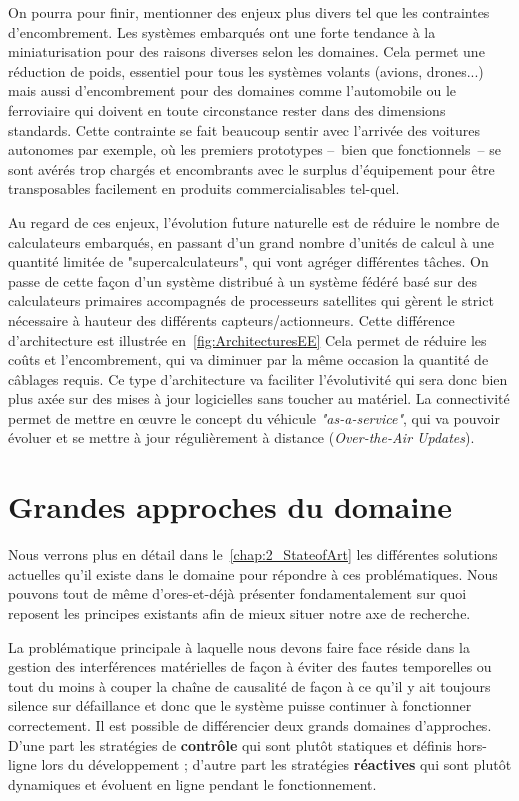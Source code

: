 \documentclass[french, a4paper, 11pt, twoside, pdftex]{StyleThese}
\begin{document}
	On pourra pour finir, mentionner des enjeux plus divers tel que les contraintes d'encombrement. Les systèmes embarqués ont une forte tendance à la miniaturisation pour des raisons diverses selon les domaines. Cela permet une réduction de poids, essentiel pour tous les systèmes volants (avions, drones...) mais aussi d'encombrement pour des domaines comme l'automobile ou le ferroviaire qui doivent en toute circonstance rester dans des dimensions standards. Cette contrainte se fait beaucoup sentir avec l'arrivée des voitures autonomes par exemple, où les premiers prototypes --~bien que fonctionnels~-- se sont avérés trop chargés et encombrants avec le surplus d'équipement pour être transposables facilement en produits commercialisables tel-quel.
	
	Au regard de ces enjeux, l'évolution future naturelle est de réduire le nombre de calculateurs embarqués, en passant d'un grand nombre d'unités de calcul à une quantité limitée de "supercalculateurs", qui vont agréger différentes tâches. On passe de cette façon d'un système distribué à un système fédéré basé sur des calculateurs primaires accompagnés de processeurs satellites qui gèrent le strict nécessaire à hauteur des différents capteurs/actionneurs. Cette différence d'architecture est illustrée en~\autoref{fig:ArchitecturesEE} Cela permet de réduire les coûts et l'encombrement, qui va diminuer par la même occasion la quantité de câblages requis. Ce type d'architecture va faciliter l'évolutivité qui sera donc bien plus axée sur des mises à jour logicielles sans toucher au matériel. La connectivité permet de mettre en œuvre le concept du véhicule \textit{"as-a-service"}, qui va pouvoir évoluer et se mettre à jour régulièrement à distance (\textit{Over-the-Air Updates}). 
	
	
\section{Grandes approches du domaine}

	Nous verrons plus en détail dans le~\autoref{chap:2_StateofArt} les différentes solutions actuelles qu'il existe dans le domaine pour répondre à ces problématiques. Nous pouvons tout de même d'ores-et-déjà présenter fondamentalement sur quoi reposent les principes existants afin de mieux situer notre axe de recherche.
	
	La problématique principale à laquelle nous devons faire face réside dans la gestion des interférences matérielles de façon à éviter des fautes temporelles ou tout du moins à couper la chaîne de causalité de façon à ce qu'il y ait toujours silence sur défaillance et donc que le système puisse continuer à fonctionner correctement. Il est possible de différencier deux grands domaines d'approches. D'une part les stratégies de \textbf{contrôle} qui sont plutôt statiques et définis hors-ligne lors du développement ; d'autre part les stratégies \textbf{réactives} qui sont plutôt dynamiques et évoluent en ligne pendant le fonctionnement.
	
\end{document}
